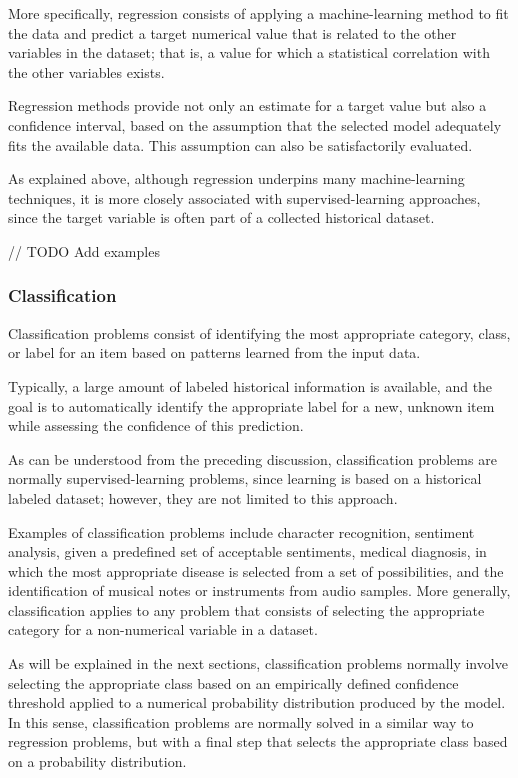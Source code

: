 More specifically, regression consists of applying a machine-learning method to fit the data and predict a target numerical value that is related to the other variables in the dataset; that is, a value for which a statistical correlation with the other variables exists.

Regression methods provide not only an estimate for a target value but also a confidence interval, based on the assumption that the selected model adequately fits the available data. This assumption can also be satisfactorily evaluated.

As explained above, although regression underpins many machine-learning techniques, it is more closely associated with supervised-learning approaches, since the target variable is often part of a collected historical dataset.

// TODO Add examples

\subsubsection{Classification}

Classification problems consist of identifying the most appropriate category, class, or label for an item based on patterns learned from the input data.

Typically, a large amount of labeled historical information is available, and the goal is to automatically identify the appropriate label for a new, unknown item while assessing the confidence of this prediction.

As can be understood from the preceding discussion, classification problems are normally supervised-learning problems, since learning is based on a historical labeled dataset; however, they are not limited to this approach.

Examples of classification problems include character recognition, sentiment analysis, given a predefined set of acceptable sentiments, medical diagnosis, in which the most appropriate disease is selected from a set of possibilities, and the identification of musical notes or instruments from audio samples. More generally, classification applies to any problem that consists of selecting the appropriate category for a non-numerical variable in a dataset.

As will be explained in the next sections, classification problems normally involve selecting the appropriate class based on an empirically defined confidence threshold applied to a numerical probability distribution produced by the model. In this sense, classification problems are normally solved in a similar way to regression problems, but with a final step that selects the appropriate class based on a probability distribution.




